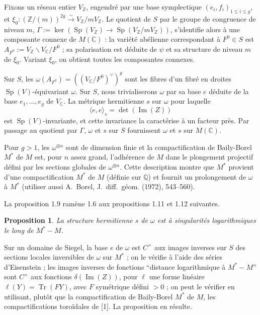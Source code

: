\documentclass[12pt,a4paper]{article}
\theoremstyle{plain}
\newtheorem{proposition}[theorem]{Proposition}
\theoremstyle{definition}
\theoremstyle{remark}
\DeclareMathOperator{\Sp}{Sp}
\DeclareMathOperator{\Tr}{Tr}
\DeclareMathOperator{\Impartie}{Im}
\newcommand{\CC}{\mathbb{C}}
\newcommand{\QQ}{\mathbb{Q}}
\newcommand{\ZZ}{\mathbb{Z}}
\providecommand{\CC}{\mathbb{C}}
\providecommand{\QQ}{\mathbb{Q}}
\providecommand{\ZZ}{\mathbb{Z}}
\providecommand{\Tr}{\operatorname{Tr}}
\begin{document}
Fixons un réseau entier $V_\ZZ$, engendré par une base symplectique $(e_i, f_i)_{1 \leq i \leq g}$, et $\xi_0 : (\ZZ/(m))^{2g} \xrightarrow{\sim} V_\ZZ/mV_\ZZ$. Le quotient de $S$ par le groupe de congruence de niveau $m$, $\Gamma := \ker(\Sp(V_\ZZ) \to \Sp(V_\ZZ/mV_\ZZ))$, s'identifie alors à une composante connexe de $M(\CC)$ : la variété abélienne correspondant à $F^0 \in S$ est $A_{F^0} := V_\ZZ \backslash V_\CC / F^0$ ; sa polarisation est déduite de $\psi$ et sa structure de niveau $m$ de $\xi_0$. Variant $\xi_0$, on obtient toutes les composantes connexes.

Sur $S$, les $\omega(A_{F^0}) = ((V_\CC/F^0)^\vee)^g$ sont les fibres d'un fibré en droites $\Sp(V)$-équivariant $\omega$. Sur $S$, nous trivialiserons $\omega$ par sa base $e$ déduite de la base $e_1, \ldots, e_g$ de $V_\CC$. La métrique hermitienne $s$ sur $\omega$ pour laquelle
\[
\langle e, e \rangle_s = \det(\Impartie(Z))
\]
est $\Sp(V)$-invariante, et cette invariance la caractérise à un facteur près. Par passage au quotient par $\Gamma$, $\omega$ et $s$ sur $S$ fournissent $\omega$ et $s$ sur $M(\CC)$.

Pour $g > 1$, les $\omega^{\otimes n}$ sont de dimension finie et la compactification de Baily-Borel $M^*$ de $M$ est, pour $n$ assez grand, l'adhérence de $M$ dans le plongement projectif défini par les sections globales de $\omega^{\otimes n}$. Cette description montre que $M^*$ provient d'une compactification $M^*$ de $M$ (définie sur $\QQ$) et fournit un prolongement de $\omega$ à $M^*$ (utiliser aussi A.~Borel, J.~diff.~géom. (1972), 543--560).

La proposition 1.9 ramène 1.6 aux propositions 1.11 et 1.12 suivantes.

\begin{proposition}
La structure hermitienne $s$ de $\omega$ est à singularités logarithmiques le long de $M^* - M$.
\end{proposition}

Sur un domaine de Siegel, la base $e$ de $\omega$ est $C^\times$ aux images inverses sur $S$ des sections locales inversibles de $\omega$ sur $M^*$ ; on le vérifie à l'aide des séries d'Eisenstein ; les images inverses de fonctions ``distance logarithmique à $M^* - M$'' sont $C^\times$ aux fonctions $\delta(\Impartie(Z))$, pour $\ell$ une forme linéaire $\ell(Y) = \Tr(FY)$, avec $F$ symétrique défini $> 0$ ; on peut le vérifier en utilisant, plutôt que la compactification de Baily-Borel $M^*$ de $M$, les compactifications toroïdales de [1]. La proposition en résulte.
\end{document}
